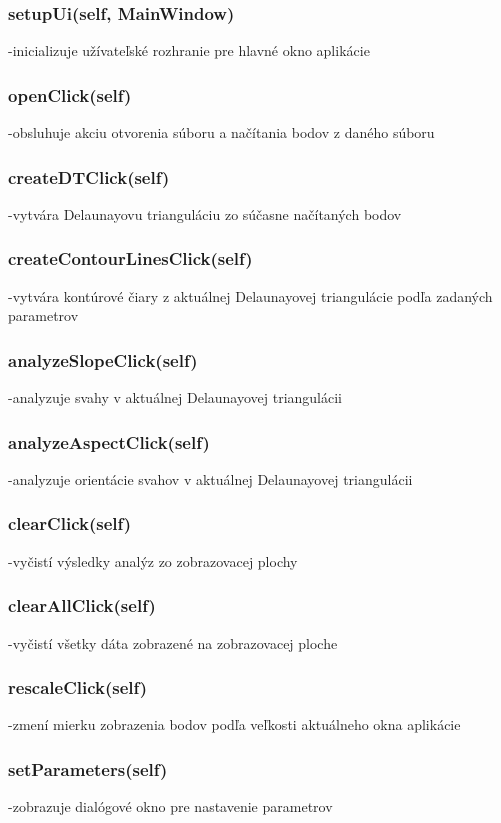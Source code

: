 \documentclass[12pt]{article}
\begin{document}
\subsubsection*{setupUi(self, MainWindow)}
\noindent-inicializuje užívateľské rozhranie pre hlavné okno aplikácie
\subsubsection*{openClick(self)}
\noindent-obsluhuje akciu otvorenia súboru a načítania bodov z daného súboru
\subsubsection*{createDTClick(self)}
\noindent-vytvára Delaunayovu trianguláciu zo súčasne načítaných bodov
\subsubsection*{createContourLinesClick(self)}
\noindent-vytvára kontúrové čiary z aktuálnej Delaunayovej triangulácie podľa zadaných parametrov
\subsubsection*{analyzeSlopeClick(self)}
\noindent-analyzuje svahy v aktuálnej Delaunayovej triangulácii
\subsubsection*{analyzeAspectClick(self)}
\noindent-analyzuje orientácie svahov v aktuálnej Delaunayovej triangulácii
\subsubsection*{clearClick(self)}
\noindent-vyčistí výsledky analýz zo zobrazovacej plochy
\subsubsection*{clearAllClick(self)}
\noindent-vyčistí všetky dáta zobrazené na zobrazovacej ploche
\subsubsection*{rescaleClick(self)}
\noindent-zmení mierku zobrazenia bodov podľa veľkosti aktuálneho okna aplikácie
\subsubsection*{setParameters(self)}
\noindent-zobrazuje dialógové okno pre nastavenie parametrov
\end{document}
